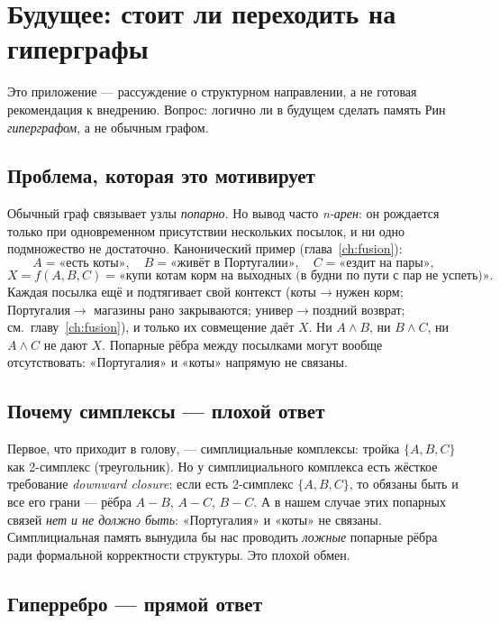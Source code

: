 \chapter{Будущее: стоит ли переходить на гиперграфы}
\label{ch:hypergraphs}

Это приложение — рассуждение о структурном направлении, а не готовая рекомендация к
внедрению. Вопрос: логично ли в будущем сделать память Рин \emph{гиперграфом}, а не
обычным графом.

\section{Проблема, которая это мотивирует}

Обычный граф связывает узлы \emph{попарно}. Но вывод часто \emph{n-арен}: он рождается
только при одновременном присутствии нескольких посылок, и ни одно подмножество не
достаточно. Канонический пример (глава~\ref{ch:fusion}):
\[
A=\text{«есть коты»},\quad B=\text{«живёт в Португалии»},\quad C=\text{«ездит на пары»},
\]
\[
X=f(A,B,C)=\text{«купи котам корм на выходных (в будни по пути с пар не успеть)»}.
\]
Каждая посылка ещё и подтягивает свой контекст (коты$\to$нужен корм; Португалия$\to$
магазины рано закрываются; универ$\to$поздний возврат; см.\ главу~\ref{ch:fusion}), и
только их совмещение даёт $X$. Ни $A\wedge B$, ни $B\wedge C$, ни $A\wedge C$ не дают
$X$. Попарные рёбра между посылками могут вообще отсутствовать: «Португалия» и «коты»
напрямую не связаны.

\section{Почему симплексы — плохой ответ}

Первое, что приходит в голову, — симплициальные комплексы: тройка $\{A,B,C\}$ как
2-симплекс (треугольник). Но у симплициального комплекса есть жёсткое требование
\emph{downward closure}: если есть 2-симплекс $\{A,B,C\}$, то обязаны быть и все его
грани — рёбра $A\!-\!B$, $A\!-\!C$, $B\!-\!C$. А в нашем случае этих попарных связей
\emph{нет и не должно быть}: «Португалия» и «коты» не связаны. Симплициальная память
вынудила бы нас проводить \emph{ложные} попарные рёбра ради формальной корректности
структуры. Это плохой обмен.

\section{Гиперребро — прямой ответ}

